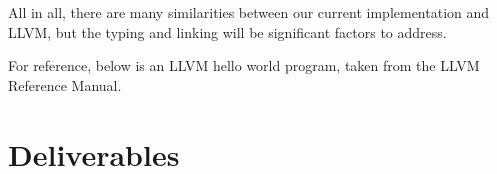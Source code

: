 \documentclass[11pt]{article}
\begin{document}
All in all, there are many similarities between our current
implementation and LLVM, but the typing and linking will be
significant factors to address.

For reference, below is an LLVM hello world program, taken from the
LLVM Reference Manual.



\section{Deliverables}



\nocite{*} 

\end{document}
